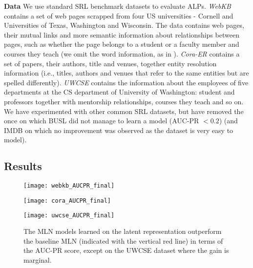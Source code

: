 \textbf{Data}
We use standard SRL benchmark datasets to evaluate ALPs.
\textit{WebKB} contains a set of web pages scrapped from four US universities - Cornell and Universities of Texas, Washington and Wisconsin.
The data contains web pages, their mutual links and more semantic information about relationships between pages, such as whether the page belongs to a student or a faculty member and courses they teach (we omit the word information, as in \cite{mihalkova:icml07}).
\textit{Cora-ER} contains a set of papers, their authors, title and venues, together entity resolution information (i.e., titles, authors and venues that refer to the same entities but are spelled differently).
\textit{UWCSE} contains the information about the employees of five departments at the CS department of University of Washington: student and professors together with mentorship relationships, courses they teach and so on.
We have experimented with other common SRL datasets, but have removed the once on which BUSL did not manage to learn a model (AUC-PR $< 0.2$) (and IMDB on which no improvement was observed as the dataset is very easy to model).








\subsection{Results}



\begin{figure}
	\centering
    \begin{minipage}[thb]{.32\linewidth}
        \centering
        \texttt{[image: webkb\_AUCPR\_final]}
    \end{minipage}
    \begin{minipage}[htb]{.32\linewidth}
        \centering
        \texttt{[image: cora\_AUCPR\_final]}
    \end{minipage}
    \begin{minipage}[htb]{.32\linewidth}
        \centering
        \texttt{[image: uwcse\_AUCPR\_final]}
    \end{minipage}
    \caption[Performance of the MLN models learned on the original and -induced data representations.]{The MLN models learned on the latent representation outperform the baseline MLN (indicated with the vertical red line) in terms of the AUC-PR score, except on the UWCSE dataset where the gain is marginal.}
    \label{fig:resultsAUCPR}
\end{figure}





